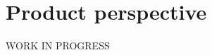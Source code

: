 \documentclass[../../rasd.tex]{subfiles}
\begin{document}
	
	\section{Product perspective}
		WORK IN PROGRESS
		
\end{document}
